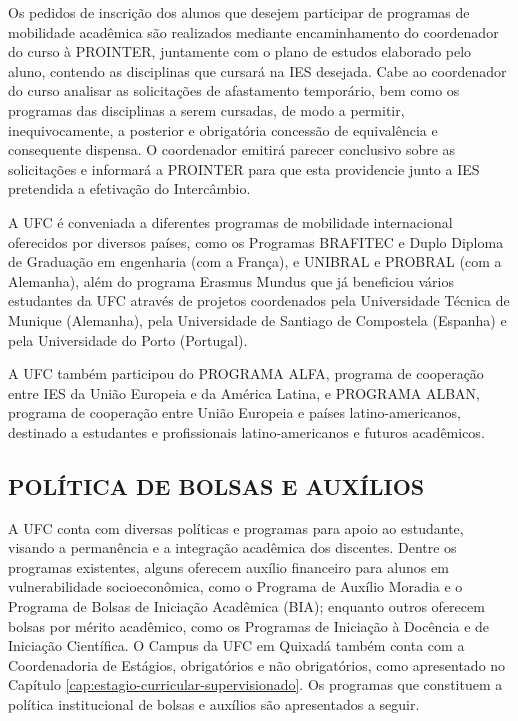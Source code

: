 Os pedidos de inscrição dos alunos que desejem participar de programas de mobilidade acadêmica são realizados mediante encaminhamento do coordenador do curso à PROINTER, juntamente com o plano de estudos elaborado pelo aluno, contendo as disciplinas que cursará na IES desejada. Cabe ao coordenador do curso analisar as solicitações de afastamento temporário, bem como os programas das disciplinas a serem cursadas, de modo a permitir, inequivocamente, a posterior e obrigatória concessão de equivalência e consequente dispensa. O coordenador emitirá parecer conclusivo sobre as solicitações e informará a PROINTER para que esta providencie junto a IES pretendida a efetivação do Intercâmbio.

A UFC é conveniada a diferentes programas de mobilidade internacional oferecidos por diversos países, como os Programas BRAFITEC e Duplo Diploma de Graduação em engenharia (com a França), e UNIBRAL e PROBRAL (com a Alemanha), além do programa Erasmus Mundus que já beneficiou vários estudantes da UFC através de projetos coordenados pela Universidade Técnica de Munique (Alemanha), pela Universidade de Santiago de Compostela (Espanha) e pela Universidade do Porto (Portugal).

A UFC também participou do PROGRAMA ALFA, programa de cooperação entre IES da União Europeia e da América Latina, e PROGRAMA ALBAN, programa de cooperação entre União Europeia e países latino-americanos, destinado a estudantes e profissionais latino-americanos e futuros acadêmicos.

\subsection{POLÍTICA DE BOLSAS E AUXÍLIOS}
\label{sec:bolsas-e-auxilios}


A UFC conta com diversas políticas e programas para apoio ao estudante, visando a permanência e a integração acadêmica dos discentes. Dentre os programas existentes, alguns oferecem auxílio financeiro para alunos em vulnerabilidade socioeconômica, como o Programa de Auxílio Moradia e o Programa de Bolsas de Iniciação Acadêmica (BIA); enquanto outros oferecem bolsas por mérito acadêmico, como os Programas de Iniciação à Docência e de Iniciação Científica.  O Campus da UFC em Quixadá também conta com a Coordenadoria de Estágios, obrigatórios e não obrigatórios, como apresentado no Capítulo \ref{cap:estagio-curricular-supervisionado}. Os programas que constituem a política institucional de bolsas e auxílios são apresentados a seguir.

